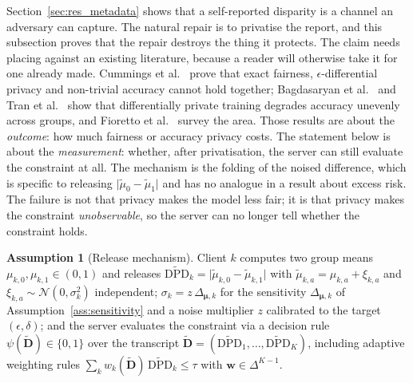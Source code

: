 \documentclass[preprint,12pt]{elsarticle}
\theoremstyle{plain}
\theoremstyle{definition}
\newtheorem{assumption}{Assumption}
\theoremstyle{remark}
\newcommand{\dpd}{\mathrm{DPD}}
\begin{document}
Section~\ref{sec:res_metadata} shows that a self-reported disparity is a channel an adversary can capture. The natural repair is to privatise the report, and this subsection proves that the repair destroys the thing it protects. The claim needs placing against an existing literature, because a reader will otherwise take it for one already made. Cummings et al.~\cite{cummings2019compatibility} prove that exact fairness, $\epsilon$-differential privacy and non-trivial accuracy cannot hold together; Bagdasaryan et al.~\cite{bagdasaryan2019differential} and Tran et al.~\cite{tran2021dperm} show that differentially private training degrades accuracy unevenly across groups, and Fioretto et al.~\cite{fioretto2022survey} survey the area. Those results are about the \emph{outcome}: how much fairness or accuracy privacy costs. The statement below is about the \emph{measurement}: whether, after privatisation, the server can still evaluate the constraint at all. The mechanism is the folding of the noised difference, which is specific to releasing $\lvert\tilde\mu_0 - \tilde\mu_1\rvert$ and has no analogue in a result about excess risk. The failure is not that privacy makes the model less fair; it is that privacy makes the constraint \emph{unobservable}, so the server can no longer tell whether the constraint holds.

\begin{assumption}[Release mechanism]\label{ass:release}
Client $k$ computes two group means $\mu_{k,0}, \mu_{k,1} \in (0,1)$ and releases $\widetilde{\dpd}_k = \lvert\tilde\mu_{k,0} - \tilde\mu_{k,1}\rvert$ with $\tilde\mu_{k,a} = \mu_{k,a} + \xi_{k,a}$ and $\xi_{k,a} \sim \mathcal{N}(0,\sigma_k^2)$ independent; $\sigma_k = z\,\Delta_{\bm{\mu},k}$ for the sensitivity $\Delta_{\bm{\mu},k}$ of Assumption~\ref{ass:sensitivity} and a noise multiplier $z$ calibrated to the target $(\epsilon,\delta)$; and the server evaluates the constraint via a decision rule $\psi(\widetilde{\bm{D}}) \in \{0,1\}$ over the transcript $\widetilde{\bm{D}} = (\widetilde{\dpd}_1,\dots,\widetilde{\dpd}_K)$, including adaptive weighting rules $\sum_k w_k(\widetilde{\bm{D}})\,\widetilde{\dpd}_k \le \tau$ with $\bm{w} \in \Delta^{K-1}$.
\end{assumption}
\end{document}
